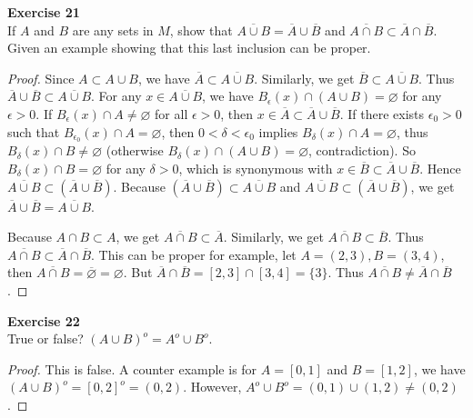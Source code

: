 \documentclass[12pt, a4paper]{article}
\theoremstyle{plain}
\newenvironment{exercise}[2][Exercise]
    { \begin{mdframed}[backgroundcolor=gray!20] \textbf{#1 #2} \\}
    {  \end{mdframed}}
\begin{document}
\begin{exercise}{21}
If $A$ and $B$ are any sets in $M$, show that $\overline{A\cup B}=\overline{A}\cup\overline{B}$ and $\overline{A\cap B}\subset \overline{A}\cap\overline{B}$. Given an example showing that this last inclusion can be proper.
\end{exercise}
    \begin{proof}
    Since $A\subset A\cup B$, we have $\overline{A}\subset \overline{A\cup B}$. Similarly, we get $\overline{B}\subset \overline{A\cup B}$. Thus $\overline{A}\cup\overline{B}\subset \overline{A\cup B}$. For any $x\in \overline{A\cup B}$, we have $B_\epsilon(x)\cap (A\cup B)=\varnothing$ for any $\epsilon >0$. If $B_\epsilon(x)\cap A\neq \varnothing$ for all $\epsilon>0$, then $x\in \overline{A}\subset \overline{A}\cup\overline{B}$. If there exists $\epsilon_0>0$ such that $B_{\epsilon_0}(x)\cap A=\varnothing$, then $0<\delta<\epsilon_0$ implies $B_\delta(x)\cap A=\varnothing$, thus $B_\delta(x)\cap B\neq \varnothing$ (otherwise $B_\delta(x)\cap (A\cup B)=\varnothing$, contradiction). So $B_\delta(x)\cap B=\varnothing$ for any $\delta>0$, which is synonymous with $x\in \overline{B}\subset \overline{A}\cup\overline{B}$. Hence $\overline{A\cup B}\subset (\overline{A}\cup\overline{B})$. Because $(\overline{A}\cup\overline{B})\subset \overline{A\cup B}$ and $\overline{A\cup B}\subset (\overline{A}\cup\overline{B})$, we get $\overline{A}\cup\overline{B}=\overline{A\cup B}$.
    
    Because $A\cap B\subset A$, we get $\overline{A\cap B}\subset \overline{A}$. Similarly, we get $\overline{A\cap B}\subset \overline{B}$. Thus $\overline{A\cap B}\subset \overline{A}\cap\overline{B}$. This can be proper for example, let $A=(2,3), B=(3,4)$, then $\overline{A\cap B}=\overline{\varnothing}=\varnothing$. But $\overline{A}\cap \overline{B}=[2,3]\cap [3,4]=\{3\}$. Thus $\overline{A\cap B}\neq \overline{A}\cap\overline{B}$. 
    \end{proof}

\begin{exercise}{22}
True or false? $(A\cup B)^o=A^o\cup B^o$. 
\end{exercise}
    \begin{proof}
    This is false. A counter example is for $A=[0,1]$ and $B=[1,2]$, we have $(A\cup B)^o=[0,2]^o=(0,2)$. However, $A^o\cup B^o=(0,1)\cup (1,2)\neq (0,2)$.
    \end{proof}
    
\pagebreak
\end{document}
